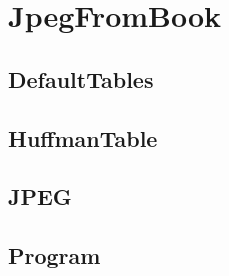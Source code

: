 \chapter{JpegFromBook}
\section*{DefaultTables}

\section*{HuffmanTable}

\section*{JPEG}

\section*{Program}

